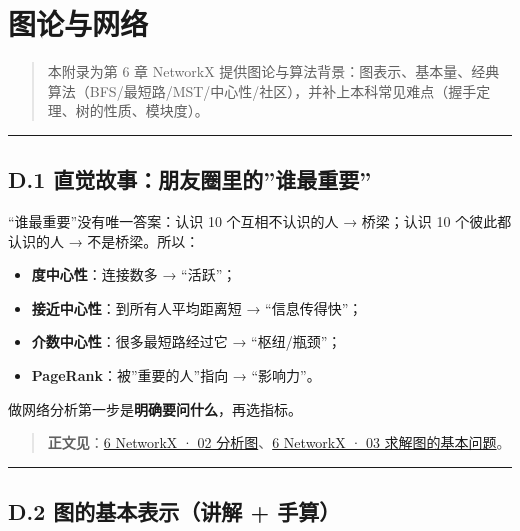 \chapter{图论与网络}\label{ux56feux8bbaux4e0eux7f51ux7edc}

\begin{quote}
本附录为第 6 章 NetworkX
提供图论与算法背景：图表示、基本量、经典算法（BFS/最短路/MST/中心性/社区），并补上本科常见难点（握手定理、树的性质、模块度）。
\end{quote}

\begin{center}\rule{0.5\linewidth}{0.5pt}\end{center}

\section{D.1
直觉故事：朋友圈里的''谁最重要''}\label{d.1-ux76f4ux89c9ux6545ux4e8bux670bux53cbux5708ux91ccux7684ux8c01ux6700ux91cdux8981}

``谁最重要''没有唯一答案：认识 10 个互相不认识的人 → 桥梁；认识 10
个彼此都认识的人 → 不是桥梁。所以：

\begin{itemize}
\tightlist
\item
  \textbf{度中心性}：连接数多 → ``活跃''；
\item
  \textbf{接近中心性}：到所有人平均距离短 → ``信息传得快''；
\item
  \textbf{介数中心性}：很多最短路经过它 → ``枢纽/瓶颈''；
\item
  \textbf{PageRank}：被''重要的人''指向 → ``影响力''。
\end{itemize}

做网络分析第一步是\textbf{明确要问什么}，再选指标。

\begin{quote}
\textbf{正文见}：\href{../../chapters/06-networkx/02-分析图.md}{6
NetworkX · 02
分析图}、\href{../../chapters/06-networkx/03-求解图的基本问题.md}{6
NetworkX · 03 求解图的基本问题}。
\end{quote}

\begin{center}\rule{0.5\linewidth}{0.5pt}\end{center}

\section{D.2 图的基本表示（讲解 +
手算）}\label{d.2-ux56feux7684ux57faux672cux8868ux793aux8bb2ux89e3-ux624bux7b97}

